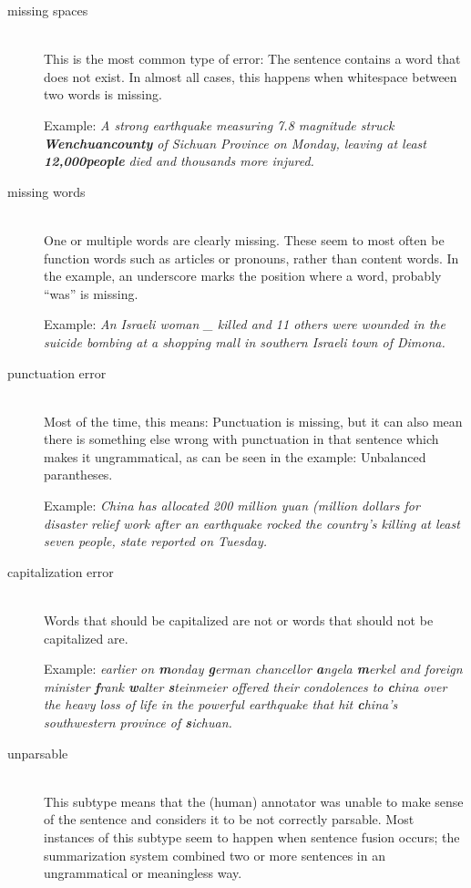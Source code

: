 \documentclass[a4paper,10pt]{scrartcl}
\theoremstyle{style}
\begin{document}
\begin{description}
\item[missing spaces] \hfill \\
	This is the most common type of error: The sentence contains a word that does not exist. In almost all cases, this happens when whitespace between two words is missing.

	Example: \textit{A strong earthquake measuring 7.8 magnitude struck \\\textbf{Wenchuancounty} of Sichuan Province on Monday, leaving at least \\\textbf{12,000people} died and thousands more injured.}

\item[missing words] \hfill \\
	One or multiple words are clearly missing. These seem to most often be function words such as articles or pronouns, rather than content words. In the example, an underscore marks the position where a word, probably ``was'' is missing.

	Example: \textit{An Israeli woman \_ killed and 11 others were wounded in the suicide bombing at a shopping mall in southern Israeli town of Dimona.}

\item[punctuation error] \hfill \\
	Most of the time, this means: Punctuation is missing, but it can also mean there is something else wrong with punctuation in that sentence which makes it ungrammatical, as can be seen in the example: Unbalanced parantheses.

	Example: \textit{China has allocated 200 million yuan (million dollars for disaster relief work after an earthquake rocked the country's killing at least seven people, state reported on Tuesday.}

\item[capitalization error] \hfill \\
	Words that should be capitalized are not or words that should not be capitalized are.

	Example: \textit{earlier on \textbf{m}onday \textbf{g}erman chancellor \textbf{a}ngela \textbf{m}erkel and foreign \\minister \textbf{f}rank \textbf{w}alter \textbf{s}teinmeier offered their condolences to \textbf{c}hina over the heavy loss of life in the powerful earthquake that hit \textbf{c}hina's southwestern province of \textbf{s}ichuan.}

\item[unparsable]\hfill \\
	This subtype means that the (human) annotator was unable to make sense of the sentence and considers it to be not correctly parsable. Most instances of this subtype seem to happen when sentence fusion occurs; the summarization system combined two or more sentences in an ungrammatical or meaningless way.


\end{description}
\end{document}
